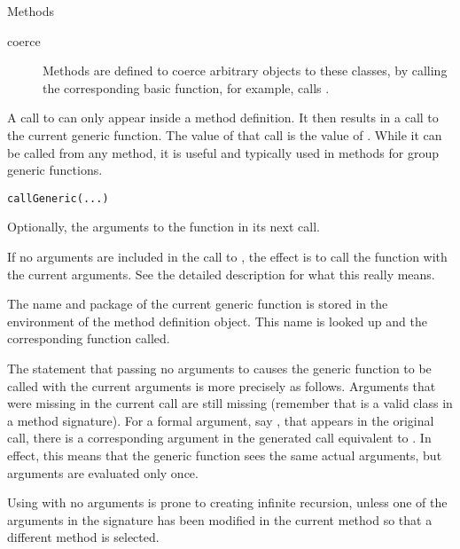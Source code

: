%
\begin{Section}{Methods}
\begin{description}

\item[coerce] Methods are defined to coerce arbitrary objects to
these classes, by calling the corresponding basic function, for
example,  calls . 

\end{description}

\end{Section}
%
\begin{Description}\relax
A call to  can only appear inside a method
definition.  It then results in a call to the current generic
function.  The value of that call is the value of .
While it can be called from any method, it is useful and typically
used in methods for group generic functions.
\end{Description}
%
\begin{Usage}
\begin{verbatim}
callGeneric(...)
\end{verbatim}
\end{Usage}
%
\begin{Arguments}
\begin{ldescription}
\item[\code{...}] 
Optionally, the arguments to the function in its next call.

If no arguments are included in the call to , the
effect is to call the function with the current arguments.
See the detailed description for what this really means.

\end{ldescription}
\end{Arguments}
%
\begin{Details}\relax
The name and package of the current generic function is stored in the
environment of the method definition object.  This name is looked up
and the corresponding function called.

The statement that passing no arguments to  causes
the generic  function to be called with the current arguments is
more precisely as follows.  Arguments that were missing in the current
call are still missing (remember that  is a valid
class in a method signature).  For a formal argument, say , that
appears in the original call, there is a corresponding argument in the
generated call equivalent to .  In effect, this
means that the generic function sees the same actual arguments, but
arguments are evaluated only once.

Using  with no arguments is prone to creating
infinite recursion, unless one of the arguments in the signature has
been modified in the current method so that a different method is selected.
\end{Details}
